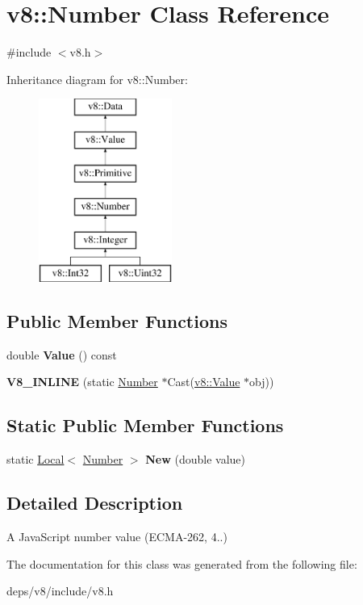 \hypertarget{classv8_1_1_number}{}\section{v8\+:\+:Number Class Reference}
\label{classv8_1_1_number}


{\ttfamily \#include $<$v8.\+h$>$}

Inheritance diagram for v8\+:\+:Number\+:\begin{figure}[H]
\begin{center}
\leavevmode
\includegraphics[height=6.000000cm]{classv8_1_1_number}
\end{center}
\end{figure}
\subsection*{Public Member Functions}
\begin{DoxyCompactItemize}
\item 
\hypertarget{classv8_1_1_number_ae7ca1af5dd34a7a32a69f57a910ab269}{}double {\bfseries Value} () const \label{classv8_1_1_number_ae7ca1af5dd34a7a32a69f57a910ab269}

\item 
\hypertarget{classv8_1_1_number_a686da7d346857e08b605c293ad79600d}{}{\bfseries V8\+\_\+\+I\+N\+L\+I\+N\+E} (static \hyperlink{classv8_1_1_number}{Number} $\ast$Cast(\hyperlink{classv8_1_1_value}{v8\+::\+Value} $\ast$obj))\label{classv8_1_1_number_a686da7d346857e08b605c293ad79600d}

\end{DoxyCompactItemize}
\subsection*{Static Public Member Functions}
\begin{DoxyCompactItemize}
\item 
\hypertarget{classv8_1_1_number_aca00a12725ca6fefb326b7e00f3d252c}{}static \hyperlink{classv8_1_1_local}{Local}$<$ \hyperlink{classv8_1_1_number}{Number} $>$ {\bfseries New} (double value)\label{classv8_1_1_number_aca00a12725ca6fefb326b7e00f3d252c}

\end{DoxyCompactItemize}


\subsection{Detailed Description}
A Java\+Script number value (E\+C\+M\+A-\/262, 4..) 

The documentation for this class was generated from the following file\+:\begin{DoxyCompactItemize}
\item 
deps/v8/include/v8.\+h\end{DoxyCompactItemize}
